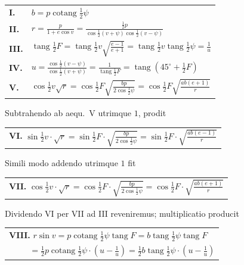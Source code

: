 \documentclass[12pt,a4paper]{book}
\newcommand{\tang}{\operatorname{tang}}
\newcommand{\cotang}{\operatorname{cotang}}
\begin{document}
\begin{center}
\begin{tabular}{@{}ll@{}}
\textbf{I.} & $b=p\cotang\tfrac{1}{2}\psi$ \\[1ex]
\textbf{II.} & $r=\frac{p}{1+e\cos v}=\frac{\tfrac{1}{2}p}{\cos\tfrac{1}{2}(v+\psi)\cos\tfrac{1}{2}(v-\psi)}$ \\[1ex]
\textbf{III.} & $\tang\tfrac{1}{2}F=\tang\tfrac{1}{2}v\sqrt{\frac{e-1}{e+1}}=\tang\tfrac{1}{2}v\tang\tfrac{1}{2}\psi=\frac{1}{u}$ \\[1ex]
\textbf{IV.} & $u=\frac{\cos\tfrac{1}{2}(v-\psi)}{\cos\tfrac{1}{2}(v+\psi)}=\frac{1}{\tang\tfrac{1}{2}F}=\tang(45^{\circ}+\tfrac{1}{2}F)$ \\[1ex]
\textbf{V.} & $\cos\tfrac{1}{2}v\sqrt{r}=\cos\tfrac{1}{2}F\sqrt{\frac{bp}{2\cos\tfrac{1}{2}\psi}}=\cos\tfrac{1}{2}F\sqrt{\frac{ab(e+1)}{r}}$
\end{tabular}
\end{center}

Subtrahendo ab aequ.~V utrimque $1$, prodit

\begin{center}
\begin{tabular}{@{}l@{}}
\textbf{VI.} $\sin\tfrac{1}{2}v\cdot\sqrt{r}=\sin\tfrac{1}{2}F\cdot\sqrt{\frac{bp}{2\cos\tfrac{1}{2}\psi}}=\sin\tfrac{1}{2}F\cdot\sqrt{\frac{ab(e-1)}{r}}$
\end{tabular}
\end{center}

Simili modo addendo utrimque $1$ fit

\begin{center}
\begin{tabular}{@{}l@{}}
\textbf{VII.} $\cos\tfrac{1}{2}v\cdot\sqrt{r}=\cos\tfrac{1}{2}F\cdot\sqrt{\frac{bp}{2\cos\tfrac{1}{2}\psi}}=\cos\tfrac{1}{2}F\cdot\sqrt{\frac{ab(e+1)}{r}}$
\end{tabular}
\end{center}

Dividendo VI per VII ad III reveniremus; multiplicatio producit

\begin{center}
\begin{tabular}{@{}l@{}}
\textbf{VIII.} $r\sin v=p\cotang\tfrac{1}{2}\psi\tang F=b\tang\tfrac{1}{2}\psi\tang F$\\
$\phantom{\textbf{VIII.}}=\tfrac{1}{2}p\cotang\tfrac{1}{2}\psi\cdot(u-\frac{1}{u})=\tfrac{1}{2}b\tang\tfrac{1}{2}\psi\cdot(u-\frac{1}{u})$
\end{tabular}
\end{center}
\end{document}
